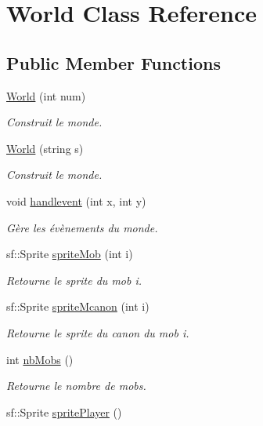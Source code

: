 \hypertarget{classWorld}{}\section{World Class Reference}
\label{classWorld}
\subsection*{Public Member Functions}
\begin{DoxyCompactItemize}
\item 
\hyperlink{classWorld_a36ef8e67290e939d93d6b46a2e58abf2}{World} (int num)
\begin{DoxyCompactList}\small\item\em Construit le monde. \end{DoxyCompactList}\item 
\hyperlink{classWorld_a355ad01d1b25fb78d93778265169ec83}{World} (string s)
\begin{DoxyCompactList}\small\item\em Construit le monde. \end{DoxyCompactList}\item 
void \hyperlink{classWorld_aafe1304ddcf960c1bb02f76a39499355}{handlevent} (int x, int y)
\begin{DoxyCompactList}\small\item\em Gère les évènements du monde. \end{DoxyCompactList}\item 
sf\+::\+Sprite \hyperlink{classWorld_a9927043bfd49fe8b6a2222350bf1dee7}{sprite\+Mob} (int i)
\begin{DoxyCompactList}\small\item\em Retourne le sprite du mob i. \end{DoxyCompactList}\item 
sf\+::\+Sprite \hyperlink{classWorld_a22d26a89c5c09fb408733518b4cd696d}{sprite\+Mcanon} (int i)
\begin{DoxyCompactList}\small\item\em Retourne le sprite du canon du mob i. \end{DoxyCompactList}\item 
int \hyperlink{classWorld_a78c5310cba881f2a5ae27def30b56222}{nb\+Mobs} ()
\begin{DoxyCompactList}\small\item\em Retourne le nombre de mobs. \end{DoxyCompactList}\item 
sf\+::\+Sprite \hyperlink{classWorld_ab2d9a669d4fff12fc637bead8ac9c850}{sprite\+Player} ()

\end{DoxyCompactItemize}
